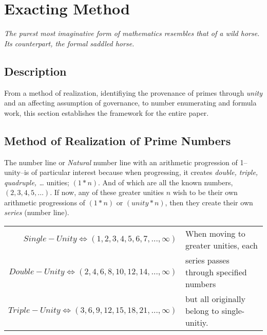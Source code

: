 \documentclass[12pt, letterpaper, twosided]{report}
\begin{document}

\chapter{Exacting Method}%
\setcounter{page}{1}
\begin{center}\textit{The purest most imaginative form of mathematics resembles that of a wild horse. Its counterpart, the formal saddled horse.}\end{center}

\section*{Description}
\hspace{0.5cm}From a method of realization, identifiying the provenance of primes through \textit{unity} and an affecting assumption of governance, to number enumerating and formula work, this section establishes the framework for the entire paper.

\section{Method of Realization of Prime Numbers}
\hspace{0.5cm}The number line or \textit{Natural} number line with an arithmetic progression of 1--unity--is of particular interest because when progressing, it creates \textit{double, triple, quadruple, \dots} unities; $(1*n)$. And of which are all the known numbers, $(2, 3, 4, 5, \dots)$. If now, any of these greater unities $n$ wish to be their own arithmetic progressions of $(1*n)$ or $(unity*n)$, then they create their own \textit{series} (number line).
\begin{flushleft}
{\renewcommand{\arraystretch}{1.25}
\renewcommand{\tabcolsep}{0.1cm}
\begin{tabular}{|r|l|}
\hline
$Single-Unity\Leftrightarrow (1, 2, 3, 4, 5, 6, 7, \dots, \infty)$ & When moving to greater unities, each\\
$Double-Unity\Leftrightarrow (2, 4, 6, 8, 10, 12, 14, \dots, \infty)$ & series passes through specified numbers\\
$Triple-Unity\Leftrightarrow (3, 6, 9, 12, 15, 18, 21, \dots, \infty)$ & but all originally belong to single-unitiy.\\
\hline
\end{tabular}}\newline\end{flushleft}
\end{document}
